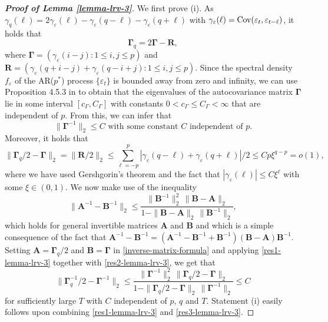 \begin{proof}[\textnormal{\textbf{Proof of Lemma \ref{lemma-lrv-3}}}] 
We first prove (i). As $\gamma_q(\ell) = 2 \gamma_{\varepsilon}(\ell) - \gamma_{\varepsilon}(q-\ell) - \gamma_{\varepsilon}(q+\ell)$ with $\gamma_{\varepsilon}(\ell) = \textnormal{Cov}(\varepsilon_t,\varepsilon_{t-\ell})$, it holds that 
\[ \boldsymbol{\Gamma}_q = 2\boldsymbol{\Gamma} - \boldsymbol{R}, \]
where $\boldsymbol{\Gamma} = (\gamma_{\varepsilon}(i-j): 1 \le i,j \le p)$ and $\boldsymbol{R} = (\gamma_{\varepsilon}(q+i-j) + \gamma_{\varepsilon}(q-i+j): 1 \le i,j \le p)$. Since the spectral density $f_{\varepsilon}$ of the AR($p^*$) process $\{\varepsilon_t\}$ is bounded away from zero and infinity, we can use Proposition 4.5.3 in \cite{BrockwellDavis1991} to obtain that the eigenvalues of the autocovariance matrix $\boldsymbol{\Gamma}$ lie in some interval $[c_{\Gamma},C_{\Gamma}]$ with constants $0 < c_{\Gamma} \le C_{\Gamma} < \infty$ that are independent of $p$. From this, we can infer that 
\begin{equation}\label{res1-lemma-lrv-3}
\| \boldsymbol{\Gamma}^{-1} \|_2 \le C \text{  with some constant } C \text{ independent of } p. 
\end{equation}
Moreover, it holds that 
\begin{equation}\label{res2-lemma-lrv-3}
\| \boldsymbol{\Gamma}_q/2 - \boldsymbol{\Gamma} \|_2 = \| \boldsymbol{R}/2 \|_2 \le \sum\limits_{\ell=-p}^p | \gamma_{\varepsilon}(q-\ell) + \gamma_{\varepsilon}(q+\ell) |/2 \le C p \xi^{q-p} = o(1), 
\end{equation}
where we have used Gershgorin's theorem and the fact that $|\gamma_{\varepsilon}(\ell)| \le C \xi^\ell$ with some $\xi \in (0,1)$. We now make use of the inequality
\begin{equation}\label{inverse-matrix-formula}
\| \boldsymbol{A}^{-1} - \boldsymbol{B}^{-1} \|_2 \le \frac{ \| \boldsymbol{B}^{-1} \|_2^2 \, \| \boldsymbol{B} - \boldsymbol{A} \|_2 }{1  -  \| \boldsymbol{B} - \boldsymbol{A} \|_2 \, \| \boldsymbol{B}^{-1} \|_2},
\end{equation}
which holds for general invertible matrices $\boldsymbol{A}$ and $\boldsymbol{B}$ and which is a simple consequence of the fact that $\boldsymbol{A}^{-1} - \boldsymbol{B}^{-1} = (\boldsymbol{A}^{-1} - \boldsymbol{B}^{-1} + \boldsymbol{B}^{-1}) (\boldsymbol{B} - \boldsymbol{A}) \boldsymbol{B}^{-1}$. Setting $\boldsymbol{A} = \boldsymbol{\Gamma}_q/2$ and $\boldsymbol{B} = \boldsymbol{\Gamma}$ in \eqref{inverse-matrix-formula} and applying \eqref{res1-lemma-lrv-3} together with \eqref{res2-lemma-lrv-3}, we get that  
\begin{equation}\label{res3-lemma-lrv-3}
\| \boldsymbol{\Gamma}_q^{-1}/2 - \boldsymbol{\Gamma}^{-1} \|_2 \le \frac{ \| \boldsymbol{\Gamma}^{-1} \|_2^2 \, \| \boldsymbol{\Gamma}_q/2 - \boldsymbol{\Gamma} \|_2 }{1  -  \| \boldsymbol{\Gamma}_q/2 - \boldsymbol{\Gamma} \|_2 \, \| \boldsymbol{\Gamma}^{-1} \|_2} \le C 
\end{equation}
for sufficiently large $T$ with $C$ independent of $p$, $q$ and $T$. Statement (i) easily follows upon combining \eqref{res1-lemma-lrv-3} and \eqref{res3-lemma-lrv-3}.



\end{proof}
